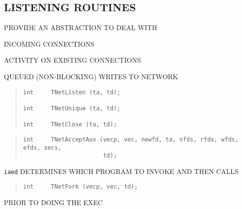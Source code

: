 \begin{bwslide}
\part*	{LISTENING ROUTINES}\bf

\begin{nrtc}
\item	PROVIDE AN ABSTRACTION TO DEAL WITH
    \begin{nrtc}
    \item	INCOMING CONNECTIONS

    \item	ACTIVITY ON EXISTING CONNECTIONS

    \item	QUEUED (NON-BLOCKING) WRITES TO NETWORK
    \end{nrtc}
\end{nrtc}
\end{bwslide}


\begin{bwslide}

\begin{quote}\small\begin{verbatim}
int     TNetListen (ta, td);

int     TNetUnique (ta, td);

int     TNetClose (ta, td);
\end{verbatim}\end{quote}
\end{bwslide}


\begin{bwslide}

\begin{quote}\small\begin{verbatim}
int     TNetAcceptAux (vecp, vec, newfd, ta, nfds, rfds, wfds, efds, secs,
                       td);
\end{verbatim}\end{quote}
\end{bwslide}


\begin{bwslide}

\begin{nrtc}
\item	\verb"iaed" DETERMINES WHICH PROGRAM TO INVOKE AND THEN CALLS
\begin{quote}\small\begin{verbatim}
int     TNetFork (vecp, vec, td);
\end{verbatim}\end{quote}
PRIOR TO DOING THE EXEC
\end{nrtc}
\end{bwslide}


